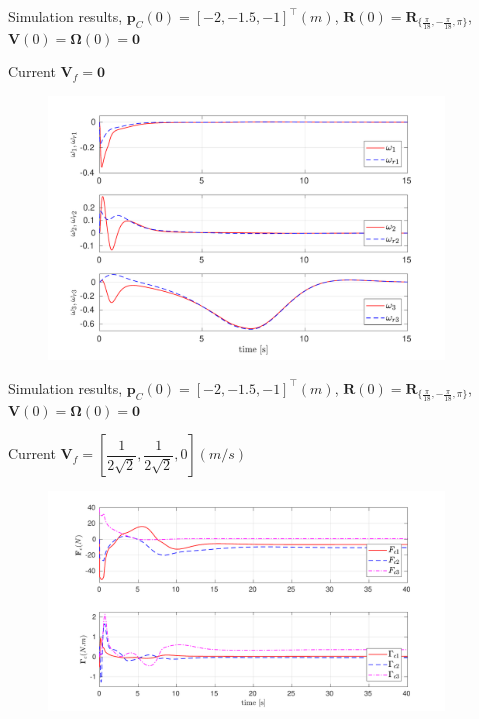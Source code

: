 \documentclass{beamer}
\begin{document}
\begin{frame}{Simulation results, \tiny$\mathbf{p}_C(0) = [-2, -1.5, -1 ]^{\top} (m)$, $\mathbf{R}(0) = \mathbf{R}_{\{\frac{\pi}{18},-\frac{\pi}{18},\pi\}}$, $\mathbf{V}(0) = \mathbf{\Omega}(0) = \mathbf{0}$}

\begin{block}{Current $\mathbf{V}_f = \mathbf{0}$}
	\begin{figure}
		\includegraphics[width = 105mm]{Images/Data_sansCurrent_Om_Omr.pdf}
	\end{figure}
\end{block}
\end{frame}


\begin{frame}{Simulation results, \tiny$\mathbf{p}_C(0) = [-2, -1.5, -1 ]^{\top} (m)$, $\mathbf{R}(0) = \mathbf{R}_{\{\frac{\pi}{18},-\frac{\pi}{18},\pi\}}$, $\mathbf{V}(0) = \mathbf{\Omega}(0) = \mathbf{0}$}

\begin{block}{Current $\mathbf{V}_f = [\dfrac{1}{2\sqrt{2}}, \dfrac{1}{2\sqrt{2}}, 0] (m/s)$}
\begin{figure}
	\includegraphics[width = 105mm]{Images/Data_avecCurrent_Fc_Gc2.pdf}	
\end{figure}
\end{block}
\end{frame}
\end{document}
